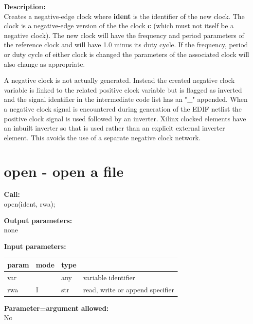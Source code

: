         {\bf Description:} \\
        Creates a negative-edge clock where {\bf ident} is the
        identifier of the new clock. The clock is a negative-edge
        version of the the clock {\bf c} (which must not itself
        be a negative clock). The new clock will have the frequency
        and period parameters of the reference clock and will have
        1.0 minus its duty cycle. If the frequency, period or duty cycle
        of either clock is changed the parameters of the associated clock will
        also change as appropriate.
        
        A negative clock is not actually generated. Instead the created
        negative clock variable is linked to the related positive clock variable
        but is flagged as inverted and the signal identifier in the intermediate
        code list has an "\_" appended. When a negative clock signal is
        encountered during generation of the EDIF netlist the positive clock
        signal is used followed by an inverter. Xilinx clocked elements
        have an inbuilt inverter so that is used rather than an explicit
        external inverter element. This avoids the use of a separate
        negative clock network.



    \section{open - open a file}\label{sec:ipopen}
        
        {\bf Call:} \\
        open(ident, rwa);
        
        {\bf Output parameters:} \\
        none
        
        {\bf Input parameters:} \\
        \begin{tabular}{| l | l | l | l |}
        \hline
        param  & mode     & type  & \\
        \hline \hline
        var &     & any & variable identifier               \\ \hline
        rwa & I   & str & read, write or append specifier   \\ \hline
        \end{tabular}
        
        {\bf Parameter=argument allowed:} \\
        No
        
